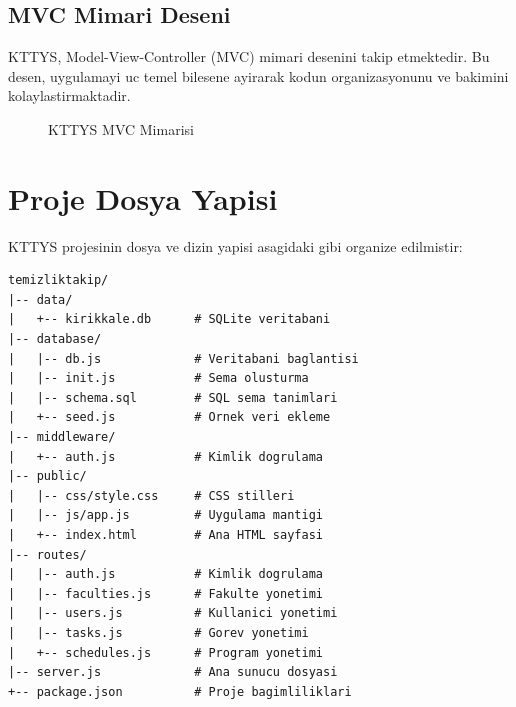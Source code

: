 \subsection{MVC Mimari Deseni}
\label{subsec:mvc-deseni}

KTTYS, Model-View-Controller (MVC) mimari desenini takip 
etmektedir. Bu desen, uygulamayi uc temel bilesene ayirarak 
kodun organizasyonunu ve bakimini kolaylastirmaktadir.

\begin{figure}[H]
\centering
{}
\caption{KTTYS MVC Mimarisi}
\label{fig:mvc-mimari}
\end{figure}

\section{Proje Dosya Yapisi}
\label{sec:dosya-yapisi}

KTTYS projesinin dosya ve dizin yapisi asagidaki gibi 
organize edilmistir:

\begin{lstlisting}[basicstyle=\ttfamily\small, frame=single, 
                   caption={Proje Dizin Yapisi}]
temizliktakip/
|-- data/
|   +-- kirikkale.db      # SQLite veritabani
|-- database/
|   |-- db.js             # Veritabani baglantisi
|   |-- init.js           # Sema olusturma
|   |-- schema.sql        # SQL sema tanimlari
|   +-- seed.js           # Ornek veri ekleme
|-- middleware/
|   +-- auth.js           # Kimlik dogrulama
|-- public/
|   |-- css/style.css     # CSS stilleri
|   |-- js/app.js         # Uygulama mantigi
|   +-- index.html        # Ana HTML sayfasi
|-- routes/
|   |-- auth.js           # Kimlik dogrulama
|   |-- faculties.js      # Fakulte yonetimi
|   |-- users.js          # Kullanici yonetimi
|   |-- tasks.js          # Gorev yonetimi
|   +-- schedules.js      # Program yonetimi
|-- server.js             # Ana sunucu dosyasi
+-- package.json          # Proje bagimliliklari
\end{lstlisting}
